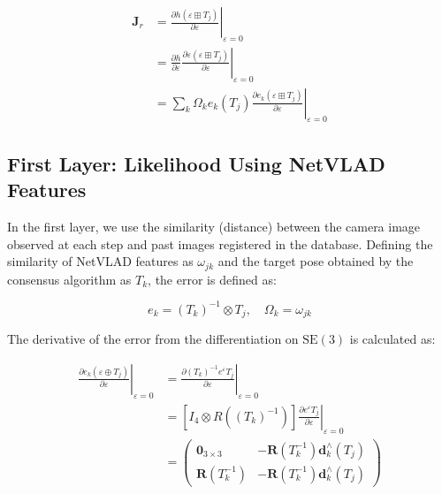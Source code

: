 \documentclass[a4paper,fleqn,10pt,twocolumn]{SICE_ISCS}
\begin{document}
\begin{equation}
\begin{aligned}
\mathbf{J}_{r} & =\left.\frac{\partial h\left(\varepsilon \boxplus T_{j}\right)}{\partial \varepsilon}\right|_{\varepsilon=0} \\
& =\left.\frac{\partial h}{\partial \varepsilon} \frac{\partial \varepsilon\left(\varepsilon \boxplus T_{j}\right)}{\partial \varepsilon}\right|_{\varepsilon=0} \\
& =\left.\sum_{k} \Omega_{k} e_{k}\left(T_{j}\right) \frac{\partial e_{k}\left(\varepsilon \boxplus T_{j}\right)}{\partial \varepsilon}\right|_{\varepsilon=0}
\end{aligned}
\end{equation}

\subsection{First Layer: Likelihood Using NetVLAD Features}
In the first layer, we use the similarity (distance) between the camera image observed at each step and past images registered in the database. Defining the similarity of NetVLAD features as $\omega_{j k}$ and the target pose obtained by the consensus algorithm as $T_{k}$, the error is defined as:

\begin{equation}
e_{k}=\left(T_{k}\right)^{-1} \otimes T_{j}, \quad \Omega_{k}=\omega_{j k}
\end{equation}

The derivative of the error from the differentiation on $\mathrm{SE}(3)$ is calculated as:

\begin{equation}
\begin{aligned}
\left.\frac{\partial e_{k}\left(\varepsilon \oplus T_{j}\right)}{\partial \varepsilon}\right|_{\varepsilon=0} & =\left.\frac{\partial\left(T_{k}\right)^{-1} e^{\varepsilon} T_{j}}{\partial \varepsilon}\right|_{\varepsilon=0} \\
& =\left[I_{4} \otimes R\left(\left(T_{k}\right)^{-1}\right)\right]\left.\frac{\partial e^{\varepsilon} T_{j}}{\partial \varepsilon}\right|_{\varepsilon=0} \\
& =\left(\begin{array}{cc}
\mathbf{0}_{3 \times 3} & -\mathbf{R}\left(T_{k}^{-1}\right) \mathbf{d}_{k}^{\wedge}\left(T_{j}\right) \\
\mathbf{R}\left(T_{k}^{-1}\right) & -\mathbf{R}\left(T_{k}^{-1}\right) \mathbf{d}_{k}^{\wedge}\left(T_{j}\right)
\end{array}\right)
\end{aligned}
\end{equation}
\end{document}
